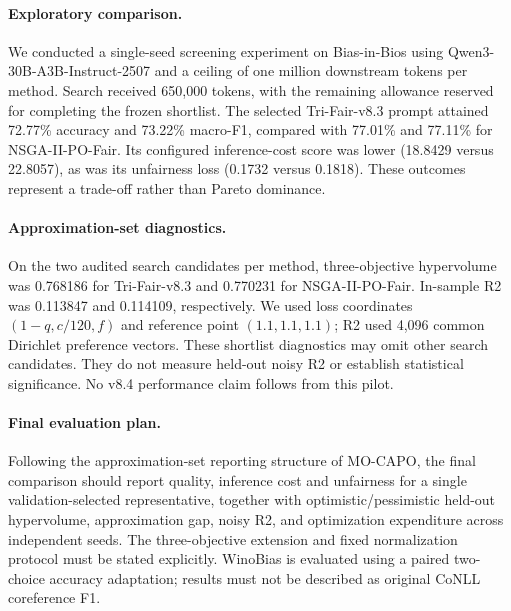 \paragraph{Exploratory comparison.}
We conducted a single-seed screening experiment on Bias-in-Bios using
Qwen3-30B-A3B-Instruct-2507 and a ceiling of one million downstream tokens per
method. Search received 650,000 tokens, with the remaining allowance reserved
for completing the frozen shortlist. The selected Tri-Fair-v8.3 prompt attained
72.77\% accuracy and 73.22\% macro-F1, compared with 77.01\% and 77.11\% for
NSGA-II-PO-Fair. Its configured inference-cost score was lower
(18.8429 versus 22.8057), as was its unfairness loss (0.1732 versus 0.1818).
These outcomes represent a trade-off rather than Pareto dominance.

\paragraph{Approximation-set diagnostics.}
On the two audited search candidates per method, three-objective hypervolume
was 0.768186 for Tri-Fair-v8.3 and 0.770231 for NSGA-II-PO-Fair. In-sample R2
was 0.113847 and 0.114109, respectively. We used loss coordinates
$(1-q,c/120,f)$ and reference point $(1.1,1.1,1.1)$; R2 used 4,096 common
Dirichlet preference vectors. These shortlist diagnostics may omit other
search candidates. They do not measure held-out noisy R2 or establish
statistical significance. No v8.4 performance claim follows from this pilot.

\paragraph{Final evaluation plan.}
Following the approximation-set reporting structure of MO-CAPO, the final
comparison should report quality, inference cost and unfairness for a single
validation-selected representative, together with optimistic/pessimistic
held-out hypervolume, approximation gap, noisy R2, and optimization expenditure
across independent seeds. The three-objective extension and fixed
normalization protocol must be stated explicitly. WinoBias is evaluated using
a paired two-choice accuracy adaptation; results must not be described as
original CoNLL coreference F1.
